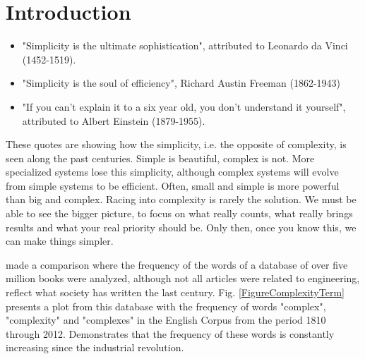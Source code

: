 \section{Introduction}
\begin{itemize}
\item "Simplicity is the ultimate sophistication", attributed to Leonardo da Vinci (1452-1519).
\item "Simplicity is the soul of efficiency", Richard Austin Freeman (1862-1943)
\item "If you can't explain it to a six year old, you don't understand it yourself", attributed to Albert Einstein (1879-1955).
\end{itemize}

These quotes are showing how the simplicity, i.e. the opposite of complexity, is seen along the past centuries. Simple is beautiful, complex is not. 
More specialized systems lose this simplicity, although complex systems will evolve from simple systems to be efficient.
Often, small and simple is more powerful than big and complex. Racing into complexity is rarely the solution. We must be able to see the bigger picture, to focus on what really counts, what really brings results and what your real priority should be. Only then, once you know this, we can make things simpler.

\cite{Davies10} made a comparison where the frequency of the words of a database of over five million books were analyzed, although not all articles were related to engineering, reflect what society has written the last century. Fig. \ref{FigureComplexityTerm} presents a plot from this database with the frequency of words "complex", "complexity" and "complexes" in the English Corpus from the period 1810 through 2012. Demonstrates that the frequency of these words is constantly increasing since the industrial revolution.
